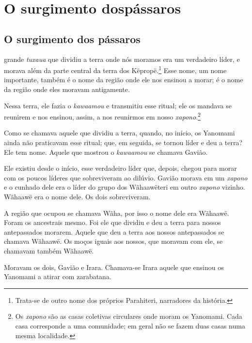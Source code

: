 
\part[O surgimento dos pássaros]{O surgimento dos\break pássaros}

\chapter{O surgimento dos pássaros}
 
grande \textit{tuxaua} que dividiu a terra onde nós moramos era um verdadeiro
líder, e morava além da parte central da terra dos
Këpropë.\footnote{Trata-se de outro nome dos próprios Parahiteri, narradores da história.} Esse nome, um nome importante, também é o nome
da região onde ele nos ensinou a morar; é o nome da região onde eles
moravam antigamente.

Nessa terra, ele fazia o \textit{kawaamou} e transmitiu esse ritual; ele os
mandava se reunirem e nos ensinou, assim, a nos
reunirmos em nosso \textit{xapono}.\footnote{Os \textit{xapono} são as casas coletivas circulares onde moram os Yanomami. Cada casa corresponde a uma comunidade; em geral não se fazem duas casas numa mesma localidade.} 

Como se chamava aquele que dividiu a terra, quando, no início, os
Yanomami ainda não praticavam esse ritual; que, em seguida, se tornou
líder e deu a terra? Ele tem nome. Aquele que mostrou
o \textit{kawaamou} se chamava Gavião.

Ele existiu desde o início, esse verdadeiro líder que, depois, chegou
para morar com os poucos líderes que sobreviveram ao dilúvio. Gavião
morava em um \textit{xapono} e o cunhado dele era o líder do grupo dos
Wãhaawëteri em outro \textit{xapono} vizinho. Wãhaawë era o nome
dele. Os dois sobreviveram.

A região que ocupou se chamava Wãha, por isso o nome dele era
 Wãhaawë. Foram os ancestrais mesmo. Foi ele que dividiu e deu a terra
 para nossos antepassados morarem. Aquele que deu a terra aos nossos
 antepassados se chamava Wãhaawë. Os moços iguais aos nossos, que moravam
 com ele, se chamavam também Wãhaawë.

Moravam os dois, Gavião e Irara. Chamava-se Irara aquele que ensinou os
Yanomami a atirar com zarabatana.

